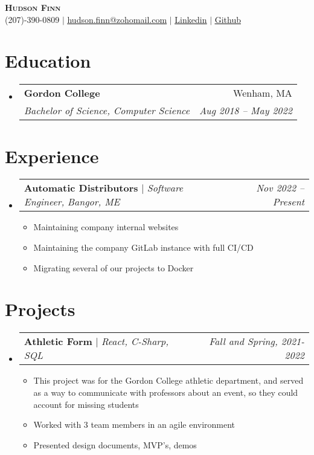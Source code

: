 \documentclass{article}
\makeatletter
\newcommand{\resumeItem}[1]{
  \item\small{
    {#1 \vspace{-2pt}}
  }
}
\newcommand{\resumeSubheading}[4]{
  \vspace{-2pt}\item
    \begin{tabular*}{0.97\textwidth}[t]{l@{\extracolsep{\fill}}r}
      \textbf{#1} & #2 \\
      \textit{#3} & \textit{#4} \\
    \end{tabular*}\vspace{-7pt}
}
\newcommand{\resumeSubSubheading}[2]{
    \item
    \begin{tabular*}{0.97\textwidth}{l@{\extracolsep{\fill}}r}
      \textit{\small#1} & \textit{\small #2} \\
    \end{tabular*}\vspace{-7pt}
}
\newcommand{\resumeJobheading}[4]{
  \vspace{-2pt}\item
    \begin{tabular*}{0.97\textwidth}[t]{l@{\extracolsep{\fill}}r}
      {\textbf{#1} $|$ \textit{#2,} \textit{#3}} & \textit{#4} \\
    \end{tabular*}\vspace{-7pt}
}
\newcommand{\resumeProjectHeading}[3]{
    \item
    \begin{tabular*}{0.97\textwidth}{l@{\extracolsep{\fill}}r}
      {\textbf{#1} $|$ \textit{#2}} & \textit{#3} \\
    \end{tabular*}\vspace{-7pt}
}
\newcommand{\resumeSubHeadingListStart}{\begin{itemize}[leftmargin=0.15in, label={}]}
\newcommand{\resumeSubHeadingListEnd}{\end{itemize}}
\newcommand{\resumeItemListStart}{\begin{itemize}}
\newcommand{\resumeItemListEnd}{\end{itemize}\vspace{-5pt}}
\makeatother
\begin{document}
\begin{center}
    \textbf{\Huge \scshape Hudson Finn} \\ \vspace{1pt}
    (207)-390-0809 $|$ \href{mailto:hudson.finn@zohomail.com}{\underline{hudson.finn@zohomail.com}} $|$ 
    \href{https://linkedin.com/in/hudson-finn}{\underline{Linkedin}} $|$
    \href{https://github.com/Kindlewing}{\underline{Github}}
\end{center}


\section{Education}
  \resumeSubHeadingListStart
    \resumeSubheading
      {Gordon College}{Wenham, MA}
      {Bachelor of Science, Computer Science}{Aug 2018 -- May 2022}
    \resumeSubHeadingListEnd


\section{Experience}
  \resumeSubHeadingListStart
    \resumeJobheading
      {Automatic Distributors}{Software Engineer}{Bangor, ME}{Nov 2022 -- Present}
      \resumeItemListStart
        \resumeItem{Maintaining company internal websites}
		\resumeItem{Maintaining the company GitLab instance with full CI/CD}
		\resumeItem{Migrating several of our projects to Docker}
      \resumeItemListEnd
  \resumeSubHeadingListEnd
  



\section{Projects}
\resumeSubHeadingListStart
	\resumeProjectHeading
		{Athletic Form}{React, C-Sharp, SQL}{Fall and Spring, 2021-2022}
		\resumeItemListStart
			\resumeItem{This project was for the Gordon College athletic 
				department, and served as a way to communicate with professors 
				about an event, so they could account for missing students}
			\resumeItem{Worked with 3 team members in an agile environment}
			\resumeItem{Presented design documents, MVP's, demos}
		\resumeItemListEnd
\resumeSubHeadingListEnd
\end{document}
